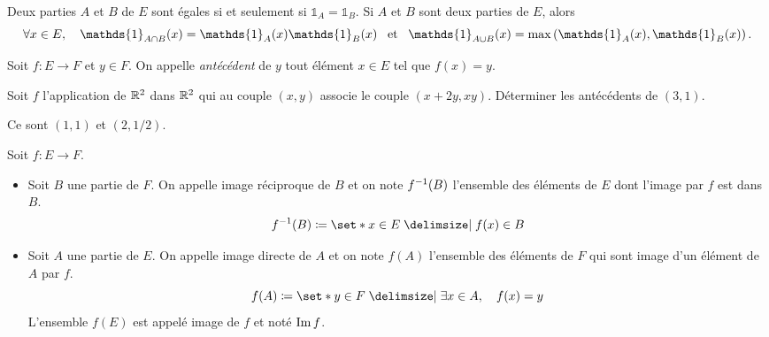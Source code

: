 \documentclass{magnolia}
\begin{document}
\begin{remarques}
\remarque Deux parties $A$ et $B$ de $E$ sont égales si et seulement si $\mathds{1}_{A}=\mathds{1}_{B}$.
\remarque Si $A$ et $B$ sont deux parties de $E$, alors
  \[\forall x\in E\qsep \mathds{1}_{A\cap B}(x)=\mathds{1}_{A}(x)\mathds{1}_{B}(x) \et \mathds{1}_{A\cup B}(x)=\max\p{\mathds{1}_{A}(x), \mathds{1}_{B}(x)}.\]
\end{remarques}



\begin{definition}[utile=-3]
Soit $f:E\to F$ et $y\in F$. On appelle \emph{antécédent} de $y$ tout élément $x\in E$
tel que $f(x)=y$.  
\end{definition}


\begin{exoUnique}
\exo Soit $f$ l'application de $\mathbb{R}^2$ dans $\mathbb{R}^2$ qui au couple $(x,y)$
  associe le couple $(x+2y,xy)$. Déterminer les antécédents de $(3,1)$.
  \begin{sol}
  Ce sont $(1,1)$ et $(2,1/2)$.
  \end{sol}
\end{exoUnique}

\begin{definition}[utile=-3]
Soit $f:E\to F$.
\begin{itemize}
\item Soit $B$ une partie de $F$. On appelle image réciproque de $B$
  et on note $f^{-1} (B)$ l'ensemble des éléments de $E$
  dont l'image par $f$ est dans $B$.
  \[f^\applirec (B)\defeq\enstq{x\in E}{f(x)\in B}\]
\item Soit $A$ une partie de $E$. On appelle image directe de $A$ 
  et on note $f(A)$ l'ensemble des éléments de $F$ qui sont
  image d'un élément de $A$ par $f$.
  \[f(A)\defeq\enstq{y\in F}{\exists x\in A \qsep f(x)=y}\]  
  L'ensemble $f(E)$ est appelé image de $f$ et noté $\operatorname{Im} f$.
\end{itemize}
\end{definition}
\end{document}
